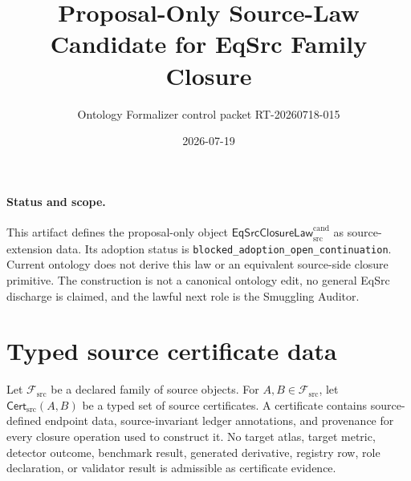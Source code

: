 \documentclass[11pt]{article}
\title{Proposal-Only Source-Law Candidate for EqSrc Family Closure}
\author{Ontology Formalizer control packet RT-20260718-015}
\date{2026-07-19}
\begin{document}
\maketitle

\paragraph{Status and scope.}
This artifact defines the proposal-only object
$\mathsf{EqSrcClosureLaw}^{\mathrm{cand}}_{\mathrm{src}}$ as source-extension
data. Its adoption status is \texttt{blocked\_adoption\_open\_continuation}.
Current ontology does not derive this law or an equivalent source-side closure
primitive. The construction is not a canonical ontology edit, no general EqSrc
discharge is claimed, and the lawful next role is the Smuggling Auditor.

\section{Typed source certificate data}

Let $\mathcal F_{\mathrm{src}}$ be a declared family of source objects. For
$A,B\in\mathcal F_{\mathrm{src}}$, let
$\mathsf{Cert}_{\mathrm{src}}(A,B)$ be a typed set of source certificates. A
certificate contains source-defined endpoint data, source-invariant ledger
annotations, and provenance for every closure operation used to construct it.
No target atlas, target metric, detector outcome, benchmark result, generated
derivative, registry row, role declaration, or validator result is admissible
as certificate evidence.
\end{document}
